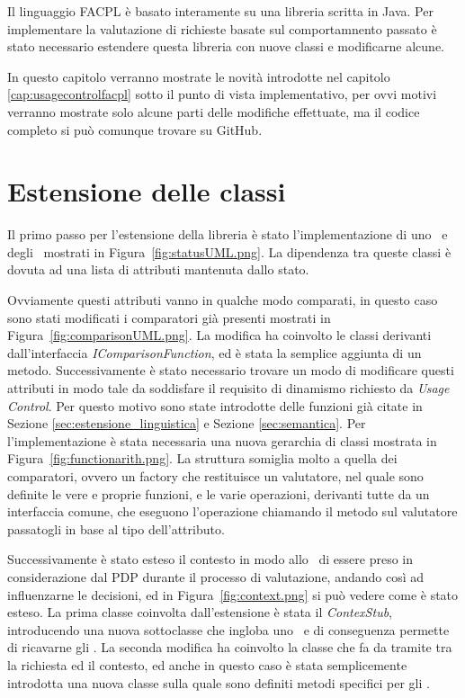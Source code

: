 \label{cap:estensione_libreria}

Il linguaggio FACPL è basato interamente su una libreria scritta in Java. 
Per implementare la valutazione di richieste basate sul comportamnento passato è stato necessario estendere questa libreria con nuove classi e modificarne alcune.\\ \par
In questo capitolo verranno mostrate le novità introdotte nel capitolo \ref{cap:usagecontrolfacpl} sotto il punto di vista implementativo, per ovvi motivi verranno mostrate solo alcune parti delle modifiche effettuate, ma il codice completo si può comunque trovare su GitHub.


\section{Estensione delle classi}
\label{sec:estensione_gerarchia}
Il primo passo per l'estensione della libreria è stato l'implementazione di uno \status \  e degli \statusattribute \ mostrati in Figura~\ref{fig:statusUML.png}.
La dipendenza tra queste classi è dovuta ad una lista di attributi mantenuta dallo stato. \\ \par
Ovviamente questi attributi vanno in qualche modo comparati, in questo caso sono stati modificati i comparatori già presenti mostrati in Figura~\ref{fig:comparisonUML.png}. La modifica ha coinvolto le classi derivanti dall'interfaccia \textit{IComparisonFunction}, ed è stata la semplice aggiunta di un metodo.
Successivamente è stato necessario trovare un modo di modificare questi attributi in modo tale da soddisfare il requisito di dinamismo richiesto da \textit{Usage Control}. 
Per questo motivo sono state introdotte delle funzioni già citate in Sezione \ref{sec:estensione_linguistica} e Sezione \ref{sec:semantica}. Per l'implementazione è stata necessaria una nuova gerarchia di classi mostrata in Figura~\ref{fig:functionarith.png}. La struttura somiglia molto a quella dei comparatori, ovvero un factory che restituisce un valutatore, nel quale sono definite le vere e proprie funzioni, e le varie operazioni, derivanti tutte da un interfaccia comune, che eseguono l'operazione chiamando il metodo sul valutatore passatogli in base al tipo dell'attributo.\\ \par
Successivamente è stato esteso il contesto in modo allo \status \ di essere preso in considerazione dal PDP durante il processo di valutazione, andando così ad influenzarne le decisioni, ed in Figura~\ref{fig:context.png} si può vedere come è stato esteso. La prima classe coinvolta dall'estensione è stata il \textit{ContexStub}, introducendo una nuova sottoclasse che ingloba uno \status \ e di conseguenza permette di ricavarne gli \statusattribute. La seconda modifica ha coinvolto la classe che fa da tramite tra la richiesta ed il contesto, ed anche in questo caso è stata semplicemente introdotta una nuova classe sulla quale sono definiti metodi specifici per gli \statusattribute. \\ \par
